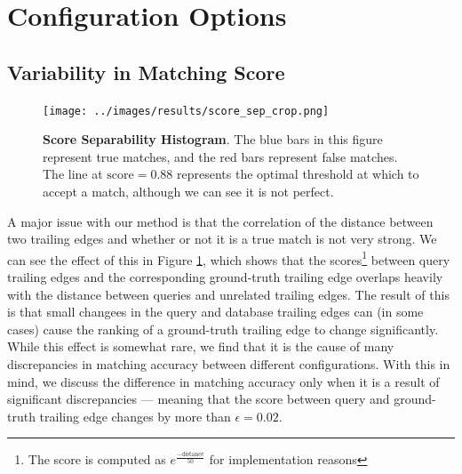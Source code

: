 \section{Configuration Options}

\subsection{Variability in Matching Score}

\begin{figure}[t]%
\centering
\texttt{[image: ../images/results/score\_sep\_crop.png]}
\caption{\textbf{Score Separability Histogram}. The blue bars in this figure represent true matches, and the red bars represent false matches. The line at $\text{score} = 0.88$ represents the optimal threshold at which to accept a match, although we can see it is not perfect.}
\label{fig:score_sep}
\end{figure}

A major issue with our method is that the correlation of the distance between two trailing edges and whether or not it is a true match is not very strong.
We can see the effect of this in Figure \ref{fig:score_sep}, which shows that the scores\footnote{The score is computed as $e^{\frac{-\text{distance}}{50}}$ for implementation reasons} between query trailing edges and the corresponding ground-truth trailing edge overlaps heavily with the distance between queries and unrelated trailing edges.
The result of this is that small changees in the query and database trailing edges can (in some cases) cause the ranking of a ground-truth trailing edge to change significantly.
While this effect is somewhat rare, we find that it is the cause of many discrepancies in matching accuracy between different configurations.
With this in mind, we discuss the difference in matching accuracy only when it is a result of significant discrepancies --- meaning that the score between query and ground-truth trailing edge changes by more than $\epsilon = 0.02$. %

